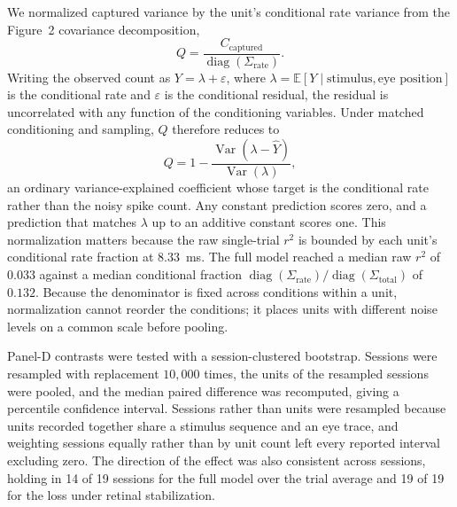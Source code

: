 \documentclass{lite}
\begin{document}
We normalized captured variance by the unit's conditional rate variance from the Figure~2 covariance decomposition,
\begin{equation}
Q
=
\frac{C_{\mathrm{captured}}}
{\operatorname{diag}(\Sigma_{\mathrm{rate}})}.
\end{equation}
Writing the observed count as $Y = \lambda + \varepsilon$, where $\lambda = \mathbb{E}[Y \mid \text{stimulus}, \text{eye position}]$ is the conditional rate and $\varepsilon$ is the conditional residual, the residual is uncorrelated with any function of the conditioning variables. Under matched conditioning and sampling, $Q$ therefore reduces to
\begin{equation}
Q
=
1-\frac{\operatorname{Var}(\lambda-\hat{Y})}{\operatorname{Var}(\lambda)},
\end{equation}
an ordinary variance-explained coefficient whose target is the conditional rate rather than the noisy spike count. Any constant prediction scores zero, and a prediction that matches $\lambda$ up to an additive constant scores one. This normalization matters because the raw single-trial $r^2$ is bounded by each unit's conditional rate fraction at $8.33$~ms. The full model reached a median raw $r^2$ of $0.033$ against a median conditional fraction $\operatorname{diag}(\Sigma_{\mathrm{rate}})/\operatorname{diag}(\Sigma_{\mathrm{total}})$ of $0.132$. Because the denominator is fixed across conditions within a unit, normalization cannot reorder the conditions; it places units with different noise levels on a common scale before pooling.

Panel-D contrasts were tested with a session-clustered bootstrap. Sessions were resampled with replacement $10{,}000$ times, the units of the resampled sessions were pooled, and the median paired difference was recomputed, giving a percentile confidence interval. Sessions rather than units were resampled because units recorded together share a stimulus sequence and an eye trace, and weighting sessions equally rather than by unit count left every reported interval excluding zero. The direction of the effect was also consistent across sessions, holding in 14 of 19 sessions for the full model over the trial average and 19 of 19 for the loss under retinal stabilization.
\end{document}
